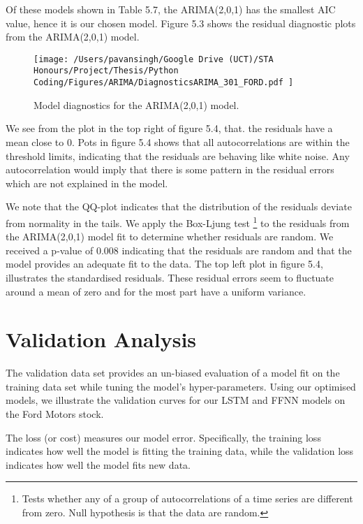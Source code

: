 Of these models shown in Table 5.7, the ARIMA(2,0,1) has the smallest AIC value, hence it is our chosen model. Figure 5.3 shows the residual diagnostic plots from the ARIMA(2,0,1) model. 

\begin{figure}[h]
\centering
  \texttt{[image: /Users/pavansingh/Google Drive (UCT)/STA Honours/Project/Thesis/Python Coding/Figures/ARIMA/DiagnosticsARIMA\_301\_FORD.pdf
]}
  \caption{Model diagnostics for the ARIMA(2,0,1) model.}
  \label{}
\end{figure}

We see from the plot in the top right of figure 5.4, that. the residuals have a mean close to 0.  Pots in figure 5.4 shows that all autocorrelations are within the threshold limits, indicating that the residuals are behaving like white noise. Any autocorrelation would imply that there is some pattern in the residual errors which are not explained in the model. 

We note that the QQ-plot indicates that the distribution of the residuals deviate from normality in the tails.  We apply the Box-Ljung test \footnote{Tests whether any of a group of autocorrelations of a time series are different from zero. Null hypothesis is that the data are random.} to the residuals from the ARIMA(2,0,1) model fit to determine whether residuals are random. We received a p-value of 0.008 indicating that the residuals are random and that the model provides an adequate fit to the data. The top left plot in figure 5.4, illustrates the standardised residuals.  These residual errors seem to fluctuate around a mean of zero and for the most part have a uniform variance. 



\section{Validation Analysis}

The validation data set provides an un-biased evaluation of a model fit on the training data set while tuning the model's hyper-parameters. Using our optimised models, we illustrate the validation curves for our LSTM and FFNN models on the Ford Motors stock.

The loss (or cost) measures our model error. Specifically, the training loss indicates how well the model is fitting the training data, while the validation loss indicates how well the model fits new data.  

